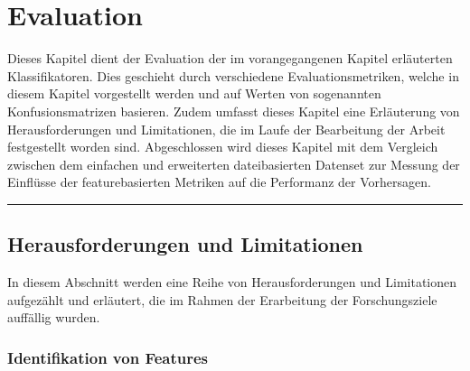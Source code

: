 
\chapter{Evaluation}
\label{evaluation}

Dieses Kapitel dient der Evaluation der im vorangegangenen Kapitel erläuterten Klassifikatoren. Dies geschieht durch verschiedene Evaluationsmetriken, welche in diesem Kapitel vorgestellt werden und auf Werten von sogenannten Konfusionsmatrizen basieren. Zudem umfasst dieses Kapitel eine Erläuterung von Herausforderungen und Limitationen, die im Laufe der Bearbeitung der Arbeit festgestellt worden sind. Abgeschlossen wird dieses Kapitel mit dem Vergleich zwischen dem \glqq einfachen\grqq{} und erweiterten dateibasierten Datenset zur Messung der Einflüsse der featurebasierten Metriken auf die Performanz der Vorhersagen. 
\\
\hrule

\section{Herausforderungen und Limitationen}

In diesem Abschnitt werden eine Reihe von Herausforderungen und Limitationen aufgezählt und erläutert, die im Rahmen der Erarbeitung der Forschungsziele auffällig wurden.

\subsection*{Identifikation von Features}

